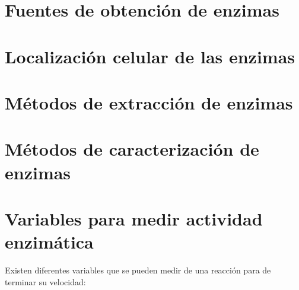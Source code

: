 


\section{Fuentes de obtención de enzimas}



\section{Localización celular de las enzimas}



\section{Métodos de extracción de enzimas}



\section{Métodos de caracterización de enzimas}



\section{Variables para medir actividad enzimática}

Existen diferentes variables que se pueden medir de una reacción para de terminar su velocidad:

